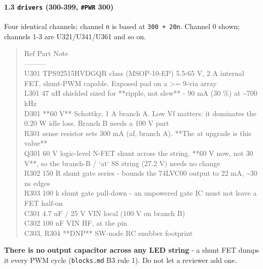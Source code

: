 \documentclass[11pt,a4paper]{article}
\begin{document}
\paragraph*{1.3 \texttt{drivers} (300-399, \texttt{\#PWR} 300)}
Four identical channels; channel \texttt{n} is based at \texttt{300 + 20n}. Channel 0 shown; channels 1-3 are U321/U341/U361 and so on.

\begin{quote}\small\ttfamily\raggedright
\textbar{} Ref \textbar{} Part \textbar{} Note \textbar{}\\
\textbar{}---\textbar{}---\textbar{}---\textbar{}\\
\textbar{} U301 \textbar{} TPS92515HVDGQR class (MSOP-10-EP) \textbar{} 5.5-65 V, 2 A internal FET, shunt-PWM capable. Exposed pad on a \textgreater{}= 9-via array \textbar{}\\
\textbar{} L301 \textbar{} 47 uH shielded \textbar{} sized for {*}{*}ripple, not slew{*}{*} - 90 mA (30 \%) at \textasciitilde{}700 kHz \textbar{}\\
\textbar{} D301 \textbar{} {*}{*}60 V{*}{*} Schottky, 1 A \textbar{} branch A. Low Vf matters: it dominates the 0.20 W idle loss. Branch B needs a 100 V part \textbar{}\\
\textbar{} R301 \textbar{} sense resistor \textbar{} sets 300 mA (af, branch A). {*}{*}The at upgrade is this value{*}{*} \textbar{}\\
\textbar{} Q301 \textbar{} 60 V logic-level N-FET \textbar{} shunt across the string. {*}{*}60 V now, not 30 V{*}{*}, so the branch-B / `at` 8S string (27.2 V) needs no change \textbar{}\\
\textbar{} R302 \textbar{} 150 R \textbar{} shunt gate series - bounds the 74LVC00 output to 22 mA, \textasciitilde{}30 ns edges \textbar{}\\
\textbar{} R303 \textbar{} 100 k \textbar{} shunt gate pull-down - an unpowered gate IC must not leave a FET half-on \textbar{}\\
\textbar{} C301 \textbar{} 4.7 uF / 25 V \textbar{} VIN local (100 V on branch B) \textbar{}\\
\textbar{} C302 \textbar{} 100 nF \textbar{} VIN HF, at the pin \textbar{}\\
\textbar{} C303, R304 \textbar{} {*}{*}DNP{*}{*} \textbar{} SW-node RC snubber footprint \textbar{}
\end{quote}
\textbf{There is no output capacitor across any LED string} - a shunt FET dumps it every PWM cycle (\texttt{blocks.md} B3 rule 1). Do not let a reviewer add one.
\end{document}
